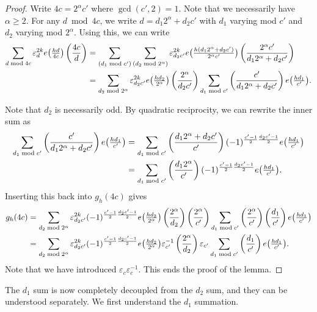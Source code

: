 \begin{proof}

Write $4c = 2^\alpha c'$ where $\gcd(c', 2) = 1$.
Note that we necessarily have $\alpha \geq 2$.
For any $d \bmod 4c$, we write $d = d_1 2^\alpha + d_2c'$ with $d_1$ varying mod $c'$ and
$d_2$ varying mod $2^\alpha$.
Using this, we can write
\begin{align}
    \sum_{d \bmod 4c} \varepsilon_d^{2k} e\big(\tfrac{hd}{4c}\big) \left(\frac{4c}{d}\right)
    &=
    \sum_{(d_1\bmod c')} \sum_{(d_2\bmod 2^\alpha)} \varepsilon_{d_2c'}^{2k}
    e\big( \tfrac{h (d_1 2^\alpha + d_2 c')}{2^\alpha c'} \big)
    \left(\frac{2^\alpha c'}{d_1 2^\alpha + d_2c'}\right)
    \\
    &=
    \sum_{d_2 \bmod 2^\alpha} \varepsilon_{d_2c'}^{2k}
    e\big(\tfrac{h d_2}{2^\alpha}\big)
    \left(\frac{2^\alpha}{d_2c'}\right) \sum_{d_1 \bmod c'}
  \left(\frac{c'}{d_1 2^\alpha+ d_2c'}\right) e\big( \tfrac{h d_1}{c'} \big).
\end{align}

Note that $d_2$ is necessarily odd.
By quadratic reciprocity, we can rewrite the inner sum as
\begin{align}
    \sum_{d_1 \bmod c'} \left(\frac{c'}{d_1 2^\alpha+ d_2c'}\right) e\big( \tfrac{h d_1}{c'} \big)
    &=
    \sum_{d_1 \bmod c'} \left(\frac{d_1 2^\alpha + d_2 c'}{c'}\right)
    (-1)^{\frac{c'-1}{2} \frac{d_2c'-1}{2}} e \big( \tfrac{h d_1}{c'} \big)
    \\
    &=
    \sum_{d_1 \bmod c'} \left(\frac{d_1 2^\alpha}{c'}\right) (-1)^{\frac{c'-1}{2}
    \frac{d_2c'-1}{2}} e\big( \tfrac{h d_1}{c'}\big).
\end{align}
Inserting this back into $g_h(4c)$ gives
\begin{align}
  g_h(4c)
  &=
  \sum_{d_2\bmod 2^\alpha} \varepsilon_{d_2c'}^{2k} (-1)^{\frac{c'-1}{2}
  \frac{d_2c'-1}{2}} e\big( \tfrac{h d_2}{2^\alpha} \big) \left(\frac{2^\alpha}{d_2}\right)
  \left(\frac{2^\alpha}{c'}\right)\sum_{d_1\bmod c'} \left(\frac{2^\alpha}{c'}\right)\left(\frac{d_1}{c'}\right)
  e\big( \tfrac{h d_1}{c'} \big) \\
  &=
  \sum_{d_2\bmod 2^\alpha} \varepsilon_{d_2c'}^{2k} (-1)^{\frac{c'-1}{2}
  \frac{d_2c'-1}{2}} e\big( \tfrac{h d_2}{2^\alpha} \big)
  \varepsilon_{c'}^{-1} \left(\frac{2^\alpha}{d_2}\right)
  \varepsilon_{c'}\sum_{d_1\bmod c'} \left(\frac{d_1}{c'}\right)  e\big( \tfrac{h d_1}{c'} \big).
\end{align}
Note that we have introduced $\varepsilon_c \varepsilon_c^{-1}$.
This ends the proof of the lemma.
\end{proof}


The $d_1$ sum is now completely decoupled from the $d_2$ sum, and they can be understood
separately.
We first understand the $d_1$ summation.


